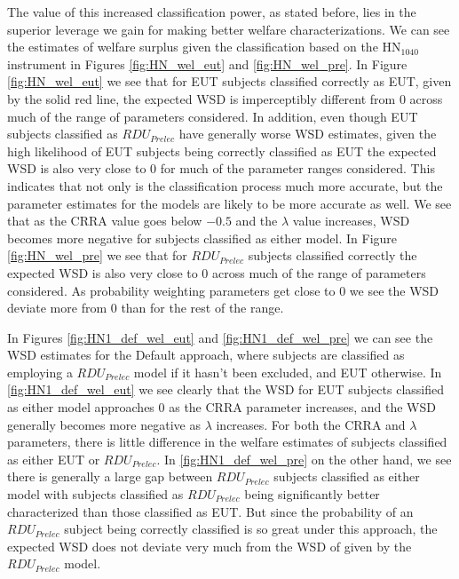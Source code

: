 \documentclass[../main.tex]{subfiles}
\begin{document}
The value of this increased classification power, as stated before, lies in the superior leverage we gain for making better welfare characterizations.
We can see the estimates of welfare surplus given the classification based on the $\text{HN}_{1040}$ instrument in Figures \ref{fig:HN_wel_eut} and \ref{fig:HN_wel_pre}.
In Figure \ref{fig:HN_wel_eut} we see that for EUT subjects classified correctly as EUT, given by the solid red line, the expected WSD is imperceptibly different from 0 across much of the range of parameters considered.
In addition, even though EUT subjects classified as $\mathit{RDU_{Prelec}}$ have generally worse WSD estimates, given the high likelihood of EUT subjects being correctly classified as EUT the expected WSD is also very close to 0 for much of the parameter ranges considered.
This indicates that not only is the classification process much more accurate, but the parameter estimates for the models are likely to be more accurate as well.
We see that as the CRRA value goes below $-0.5$ and the $\lambda$ value increases, WSD becomes more negative for subjects classified as either model.
In Figure \ref{fig:HN_wel_pre} we see that for $\mathit{RDU_{Prelec}}$ subjects classified correctly the expected WSD is also very close to 0 across much of the range of parameters considered.
As probability weighting parameters get close to 0 we see the WSD deviate more from 0 than for the rest of the range. 

In Figures \ref{fig:HN1_def_wel_eut} and \ref{fig:HN1_def_wel_pre} we can see the WSD estimates for the Default approach, where subjects are classified as employing a $\mathit{RDU_{Prelec}}$ model if it hasn't been excluded, and EUT otherwise.
In \ref{fig:HN1_def_wel_eut} we see clearly that the WSD for EUT subjects classified as either model approaches 0 as the CRRA parameter increases, and the WSD generally becomes more negative as $\lambda$ increases.
For both the CRRA and $\lambda$ parameters, there is little difference in the welfare estimates of subjects classified as either EUT or $\mathit{RDU_{Prelec}}$.
In \ref{fig:HN1_def_wel_pre} on the other hand, we see there is generally a large gap between $\mathit{RDU_{Prelec}}$ subjects classified as either model with subjects classified as $\mathit{RDU_{Prelec}}$ being significantly better characterized than those classified as EUT.
But since the probability of an $\mathit{RDU_{Prelec}}$ subject being correctly classified is so great under this approach, the expected WSD does not deviate very much from the WSD of given by the $\mathit{RDU_{Prelec}}$ model.
\end{document}
